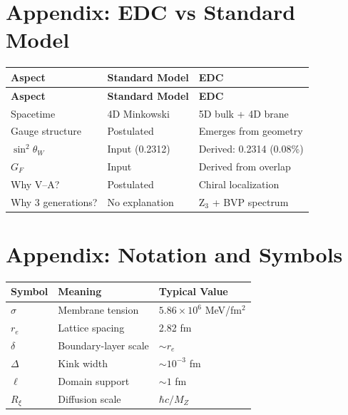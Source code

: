 \documentclass[11pt,a4paper]{book}
\theoremstyle{definition}
\theoremstyle{remark}
\begin{document}


\backmatter



\chapter*{Appendix: EDC vs Standard Model}

\begin{center}
\begin{longtable}{p{4cm}p{5cm}p{5cm}}
\toprule
\textbf{Aspect} & \textbf{Standard Model} & \textbf{EDC} \\
\midrule
\endfirsthead
\toprule
\textbf{Aspect} & \textbf{Standard Model} & \textbf{EDC} \\
\midrule
\endhead
\bottomrule
\endfoot
\bottomrule
\endlastfoot

Spacetime & 4D Minkowski & 5D bulk + 4D brane \\
Gauge structure & Postulated & Emerges from geometry \\
$\sin^2\theta_W$ & Input (0.2312) & Derived: 0.2314 (0.08\%) \\
$G_F$ & Input & Derived from overlap \\
Why V--A? & Postulated & Chiral localization \\
Why 3 generations? & No explanation & Z$_3$ + BVP spectrum \\
\end{longtable}
\end{center}

\chapter*{Appendix: Notation and Symbols}

\begin{center}
\begin{tabular}{lll}
\toprule
\textbf{Symbol} & \textbf{Meaning} & \textbf{Typical Value} \\
\midrule
$\sigma$ & Membrane tension & $5.86 \times 10^{6}$ MeV/fm$^2$ \\
$r_e$ & Lattice spacing & 2.82 fm \\
$\delta$ & Boundary-layer scale & $\sim r_e$ \\
$\Delta$ & Kink width & $\sim 10^{-3}$ fm \\
$\ell$ & Domain support & $\sim 1$ fm \\
$R_\xi$ & Diffusion scale & $\hbar c / M_Z$ \\
\bottomrule
\end{tabular}
\end{center}

\printbibliography[heading=bibintoc,title={References}]
\end{document}
